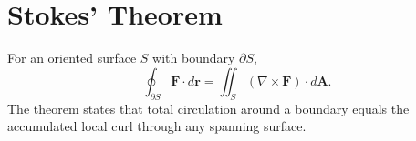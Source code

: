 \section{Stokes' Theorem}
\label{sec:stokes-theorem}
For an oriented surface $S$ with boundary $\partial S$,
\[
\oint_{\partial S}\mathbf F\cdot d\mathbf r
=\iint_S(\nabla\times\mathbf F)\cdot d\mathbf A.
\]
The theorem states that total circulation around a boundary equals the accumulated local curl through any spanning surface.
